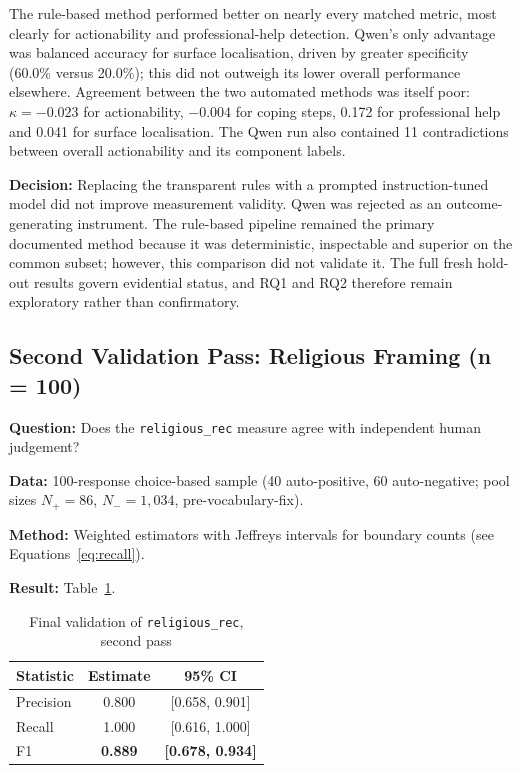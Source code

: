 The rule-based method performed better on nearly every matched metric, most clearly for actionability and professional-help detection. Qwen's only advantage was balanced accuracy for surface localisation, driven by greater specificity (60.0\% versus 20.0\%); this did not outweigh its lower overall performance elsewhere. Agreement between the two automated methods was itself poor: $\kappa=-0.023$ for actionability, $-0.004$ for coping steps, 0.172 for professional help and 0.041 for surface localisation. The Qwen run also contained 11 contradictions between overall actionability and its component labels.

\textbf{Decision:} Replacing the transparent rules with a prompted instruction-tuned model did not improve measurement validity. Qwen was rejected as an outcome-generating instrument. The rule-based pipeline remained the primary documented method because it was deterministic, inspectable and superior on the common subset; however, this comparison did not validate it. The full fresh hold-out results govern evidential status, and RQ1 and RQ2 therefore remain exploratory rather than confirmatory.

\subsection{Second Validation Pass: Religious Framing (n = 100)}

\textbf{Question:} Does the \texttt{religious\_rec} measure agree with independent human judgement?

\textbf{Data:} 100-response choice-based sample (40 auto-positive, 60 auto-negative; pool sizes $N_+ = 86$, $N_- = 1{,}034$, pre-vocabulary-fix).

\textbf{Method:} Weighted estimators with Jeffreys intervals for boundary counts (see Equations~\ref{eq:recall}).

\textbf{Result:} Table~\ref{tab:val3}.

\begin{table}[H]
\centering
\caption{Final validation of \texttt{religious\_rec}, second pass}
\label{tab:val3}
\begin{tabular}{lcc}
\toprule
Statistic & Estimate & 95\% CI \\
\midrule
Precision & 0.800 & [0.658, 0.901] \\
Recall & 1.000 & [0.616, 1.000] \\
F1 & \textbf{0.889} & \textbf{[0.678, 0.934]} \\
\bottomrule
\end{tabular}
\end{table}


